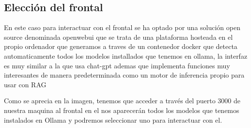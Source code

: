 \subsection{Elección del frontal}

En este caso para interactuar con el frontal se ha optado por una solución open source denominada openwebui\cite{openwebui} que se trata  de una plataforma hosteada en el propio ordenador que generamos a traves de un contenedor docker que detecta automaticamente todos los modelos installados que tenemos en ollama, la interfaz es muy similar a la que usa chat-gpt ademas que implementa funciones muy interesantes de manera predeterminada como un motor de inferencia propio para usar con RAG


Como se aprecia en la imagen, tenemos que acceder a través del puerto 3000 de nuestra maquina al frontal en el nos aparecerán todos los modelos que tenemos instalados en Ollama y podremos seleccionar uno para interactuar con el.